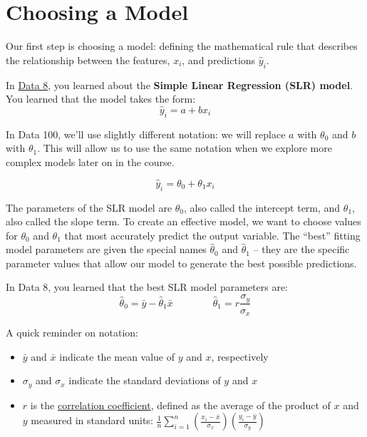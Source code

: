 \documentclass[
  letterpaper,
  DIV=11,
  numbers=noendperiod]{scrreprt}
\providecommand{\tightlist}{%
  \setlength{\itemsep}{0pt}\setlength{\parskip}{0pt}}\usepackage{longtable,booktabs,array}
\begin{document}
\hypertarget{choosing-a-model}{%
\section{Choosing a Model}\label{choosing-a-model}}

Our first step is choosing a model: defining the mathematical rule that
describes the relationship between the features, \(x_i\), and
predictions \(\hat{y}_i\).

In
\href{https://inferentialthinking.com/chapters/15/4/Least_Squares_Regression.html}{Data
8}, you learned about the \textbf{Simple Linear Regression (SLR) model}.
You learned that the model takes the form: \[\hat{y}_i = a + bx_i\]

In Data 100, we'll use slightly different notation: we will replace
\(a\) with \(\theta_0\) and \(b\) with \(\theta_1\). This will allow us
to use the same notation when we explore more complex models later on in
the course.

\[\hat{y}_i = \theta_0 + \theta_1 x_i\]

The parameters of the SLR model are \(\theta_0\), also called the
intercept term, and \(\theta_1\), also called the slope term. To create
an effective model, we want to choose values for \(\theta_0\) and
\(\theta_1\) that most accurately predict the output variable. The
``best'' fitting model parameters are given the special names
\(\hat{\theta}_0\) and \(\hat{\theta}_1\) -- they are the specific
parameter values that allow our model to generate the best possible
predictions.

In Data 8, you learned that the best SLR model parameters are:
\[\hat{\theta}_0 = \bar{y} - \hat{\theta}_1\bar{x} \qquad \qquad \hat{\theta}_1 = r \frac{\sigma_y}{\sigma_x}\]

A quick reminder on notation:

\begin{itemize}
\tightlist
\item
  \(\bar{y}\) and \(\bar{x}\) indicate the mean value of \(y\) and
  \(x\), respectively
\item
  \(\sigma_y\) and \(\sigma_x\) indicate the standard deviations of
  \(y\) and \(x\)
\item
  \(r\) is the
  \href{https://inferentialthinking.com/chapters/15/1/Correlation.html\#the-correlation-coefficient}{correlation
  coefficient}, defined as the average of the product of \(x\) and \(y\)
  measured in standard units:
  \(\frac{1}{n} \sum_{i=1}^n (\frac{x_i-\bar{x}}{\sigma_x})(\frac{y_i-\bar{y}}{\sigma_y})\)
\end{itemize}
\end{document}
